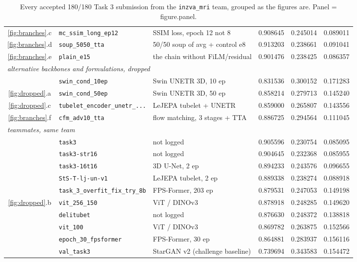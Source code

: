 \documentclass[10pt,a4paper]{article}
\begin{document}
\begin{table}[H]
\begin{tabular}{cllrrr}
\ref{fig:branches}.c & \texttt{mc\_ssim\_long\_ep12}          & SSIM loss, epoch 12 not 8       & 0.908645 & 0.245014 & 0.089011 \\
\ref{fig:branches}.d & \texttt{soup\_5050\_tta}               & 50/50 soup of avg + control e8  & 0.913203 & 0.238661 & 0.091041 \\
\ref{fig:branches}.e & \texttt{plain\_e15}                    & the chain without FiLM/residual & 0.901476 & 0.238425 & 0.086357 \\
\midrule
\multicolumn{6}{l}{\itshape alternative backbones and formulations, dropped} \\
    & \texttt{swin\_cond\_10ep}              & Swin UNETR 3D, 10 ep            & 0.831536 & 0.300152 & 0.171283 \\
\ref{fig:dropped}.a & \texttt{swin\_cond\_50ep}              & Swin UNETR 3D, 50 ep            & 0.858214 & 0.279713 & 0.145240 \\
\ref{fig:dropped}.c & \texttt{tubelet\_encoder\_unetr\_...}  & LeJEPA tubelet + UNETR          & 0.859000 & 0.265807 & 0.143556 \\
\ref{fig:branches}.f & \texttt{cfm\_adv10\_tta}               & flow matching, 3 stages + TTA   & 0.886725 & 0.294564 & 0.111045 \\
\midrule
\multicolumn{6}{l}{\itshape teammates, same team} \\
    & \texttt{task3}                         & not logged                      & 0.905596 & 0.230754 & 0.085095 \\
    & \texttt{task3-str16}                   & not logged                      & 0.904645 & 0.232368 & 0.085955 \\
    & \texttt{task3-16t16}                   & 3D U-Net, 2 ep                  & 0.894233 & 0.243576 & 0.096655 \\
    & \texttt{StS-T-lj-un-v1}                & LeJEPA tubelet, 2 ep            & 0.889338 & 0.238274 & 0.088918 \\
    & \texttt{task\_3\_overfit\_fix\_try\_8b}& FPS-Former, 203 ep              & 0.879531 & 0.247053 & 0.149198 \\
\ref{fig:dropped}.b & \texttt{vit\_256\_150}                 & ViT / DINOv3                    & 0.878918 & 0.248285 & 0.149620 \\
    & \texttt{delitubet}                     & not logged                      & 0.876630 & 0.248372 & 0.138818 \\
    & \texttt{vit\_100}                      & ViT / DINOv3                    & 0.869782 & 0.263875 & 0.152566 \\
    & \texttt{epoch\_30\_fpsformer}          & FPS-Former, 30 ep               & 0.864881 & 0.283937 & 0.156116 \\
    & \texttt{val\_task3}                    & StarGAN v2 (challenge baseline) & 0.739694 & 0.343583 & 0.154472 \\
\bottomrule
\end{tabular}
\caption{Every accepted 180/180 Task 3 submission from the \texttt{inzva\_mri} team, grouped as
the figures are. Panel = figure.panel.}
\end{table}
\end{document}
